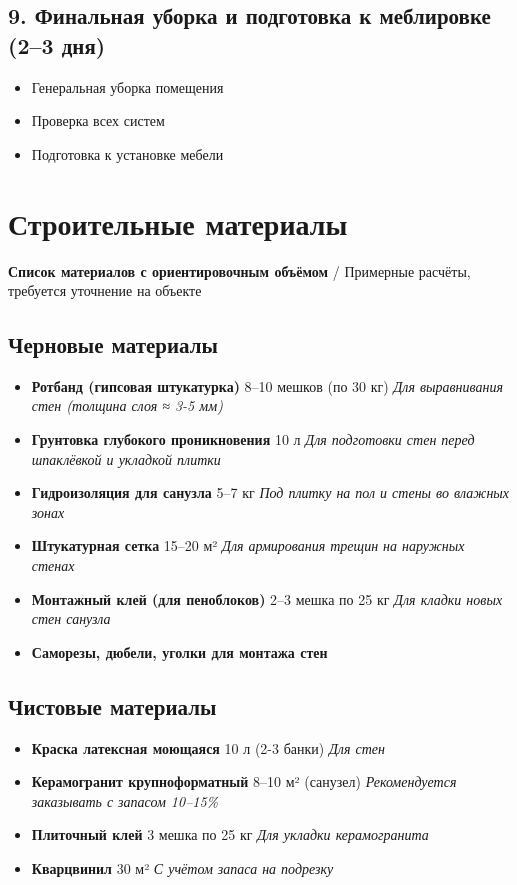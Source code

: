 \documentclass[11pt]{article}
\begin{document}
\subsection{9. Финальная уборка и подготовка к меблировке (2–3 дня)}
\label{sec:org3e3654d}

\begin{itemize}
\item Генеральная уборка помещения
\item Проверка всех систем
\item Подготовка к установке мебели
\end{itemize}
\section{Строительные материалы}
\label{sec:orgf83e81c}

\textbf{Список материалов с ориентировочным объёмом} / Примерные расчёты, требуется уточнение на объекте
\subsection{Черновые материалы}
\label{sec:org6cc0dd2}

\begin{itemize}
\item \textbf{Ротбанд (гипсовая штукатурка)} 8–10 мешков (по 30 кг) \emph{Для выравнивания стен (толщина слоя ≈ 3-5 мм)}
\item \textbf{Грунтовка глубокого проникновения} 10 л \emph{Для подготовки стен перед шпаклёвкой и укладкой плитки}
\item \textbf{Гидроизоляция для санузла} 5–7 кг \emph{Под плитку на пол и стены во влажных зонах}
\item \textbf{Штукатурная сетка} 15–20 м² \emph{Для армирования трещин на наружных стенах}
\item \textbf{Монтажный клей (для пеноблоков)} 2–3 мешка по 25 кг \emph{Для кладки новых стен санузла}
\item \textbf{Саморезы, дюбели, уголки для монтажа стен}
\end{itemize}
\subsection{Чистовые материалы}
\label{sec:orge78f67d}

\begin{itemize}
\item \textbf{Краска латексная моющаяся} 10 л (2-3 банки) \emph{Для стен}
\item \textbf{Керамогранит крупноформатный} 8–10 м² (санузел) \emph{Рекомендуется заказывать с запасом 10–15\%}
\item \textbf{Плиточный клей} 3 мешка по 25 кг \emph{Для укладки керамогранита}
\item \textbf{Кварцвинил} 30 м² \emph{С учётом запаса на подрезку}
\end{itemize}
\end{document}
